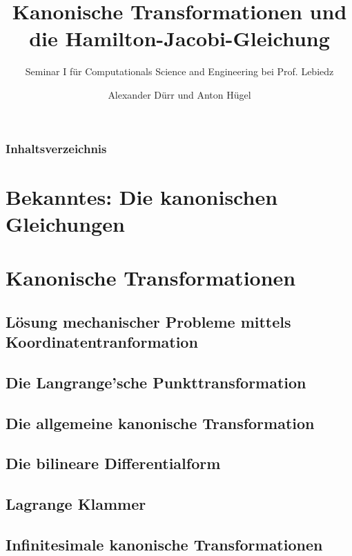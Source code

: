 \documentclass{beamer}
\title{Kanonische Transformationen und die Hamilton-Jacobi-Gleichung}
\subtitle{Seminar I für Computationals Science and Engineering bei Prof. Lebiedz}
\author{Alexander Dürr und Anton Hügel}
\institute
{\\Universität Ulm, Institut für Numerische Mathematik}
\begin{document}
\hspace*{-1.49cm}
\frame[plain]{\titlepage}

\hspace*{-0.7cm}
\begin{frame}
  \frametitle{Inhaltsverzeichnis}
  \tableofcontents
\end{frame}


\section{Bekanntes: Die kanonischen Gleichungen}

\section{Kanonische Transformationen}
    

    \subsection{Lösung mechanischer Probleme mittels Koordinatentranformation}
    
    
    \subsection{Die Langrange'sche Punkttransformation}
    
    
    \subsection{Die allgemeine kanonische Transformation}
    
    
    \subsection{Die bilineare Differentialform}
    
    
    \subsection{Lagrange Klammer}
    
    
    \subsection{Infinitesimale kanonische Transformationen}
    
        
\end{document}
